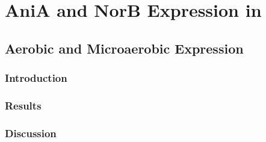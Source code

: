 \chapter{AniA and NorB Expression in \Nm{}}
\label{chap:expression}
\section{Aerobic and Microaerobic Expression}
\subsection{Introduction}
\subsection{Results}
\subsection{Discussion}